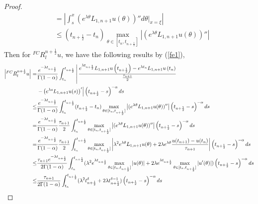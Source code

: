 \documentclass[10pt, reqno]{amsart}
\theoremstyle{remark}
\theoremstyle{definition}
\numberwithin{table}{section}
\begin{document}
\begin{proof}
\begin{equation}
\begin{aligned}
        &=\left| \int_{s}^{x}(e^{\lambda \theta}L_{1, n+1}u(\theta))''d\theta|_{x=\xi}\right|\\
        &\leq (t_{n+\frac{1}{2}}-t_n)\max_{\theta\in[t_n, t_{n+\frac{1}{2}}]} \left|(e^{\lambda \theta}L_{1, n+1}u(\theta))''\right|
    \end{aligned}
\end{equation}
Then for ${}^{FC}R^{n+\frac{1}{2}}_lu$, we have the following results by (\ref{fe1}), 
\begin{align}
\left| {}^{FC}R^{n+\frac{1}{2}}_lu\right|=&\frac{e^{-\lambda t_{n+\frac{1}{2}}}}{\Gamma(1-\alpha)} \int_{t_{n}}^{t_{n+\frac{1}{2}}} \left\lvert\,  \frac{e^{\lambda t_{n+\frac{1}{2}}} L_{1,  n+1} u\left(t_{n+\frac{1}{2}}\right)-e^{\lambda t_n} L_{1,  n+1} u\left(t_n\right)}{\frac{\tau_{n+1}}{2}}\right.  \notag\\
& \left. -\left(e^{\lambda s} L_{1,  n+1} u(s)\right)^{\prime}\right| \left(t_{n+\frac{1}{2}}-s\right)^{-\alpha} d s\notag\\
\leq& \frac{e^{-\lambda t_{n+\frac{1}{2}}}}{\Gamma(1-\alpha)} \int_{t_{n}}^{t_{n+\frac{1}{2}}} (t_{n+\frac{1}{2}}-t_n)\max_{\theta\in[t_n, t_{n+\frac{1}{2}}]} \left|(e^{\lambda \theta}L_{1, n+1}u(\theta))''\right|\left(t_{n+\frac{1}{2}}-s\right)^{-\alpha}ds\notag\\
=&\frac{e^{-\lambda t_{n+\frac{1}{2}}}}{\Gamma(1-\alpha)} \frac{\tau_{n+1}}{2}\int_{t_{n}}^{t_{n+\frac{1}{2}}} \max_{\theta\in[t_n, t_{n+\frac{1}{2}}]} \left|(e^{\lambda \theta}L_{1, n+1}u(\theta))''\right|\left(t_{n+\frac{1}{2}}-s\right)^{-\alpha}ds\notag\\
=&\frac{e^{-\lambda t_{n+\frac{1}{2}}}}{\Gamma(1-\alpha)} \frac{\tau_{n+1}}{2}\int_{t_{n}}^{t_{n+\frac{1}{2}}} \max_{\theta\in[t_n, t_{n+\frac{1}{2}}]} \left|\lambda^2e^{\lambda \theta}L_{1, n+1}u(\theta)+2\lambda e^{\lambda \theta}\frac{u(t_{n+1})-u(t_n)}{\tau_{n+1}} \right|\left(t_{n+\frac{1}{2}}-s\right)^{-\alpha}ds\notag\\
\leq& \frac{\tau_{n+1}e^{-\lambda t_{n+\frac{1}{2}}}}{2\Gamma(1-\alpha)}\int_{t_{n}}^{t_{n+\frac{1}{2}}} (\lambda^2e^{\lambda t_{n+\frac{1}{2}}}\max_{\theta\in[t_n, t_{n+\frac{1}{2}}]}\left|u(\theta)\right|+2\lambda e^{\lambda t_{n+\frac{1}{2}}}\max_{\theta\in[t_n, t_{n+\frac{1}{2}}]}\left|u'(\theta)\right|)\left(t_{n+\frac{1}{2}}-s\right)^{-\alpha}ds\notag\\
\leq & \frac{\tau_{n+1}}{2\Gamma(1-\alpha)} \int_{t_{n}}^{t_{n+\frac{1}{2}}}(\lambda^2t_{n+\frac{1}{2}}^\delta+2\lambda t_{n+\frac{1}{2}}^{\delta-1})\left(t_{n+\frac{1}{2}}-s\right)^{-\alpha}ds\notag\\

\end{align}
\end{proof}
\end{document}
